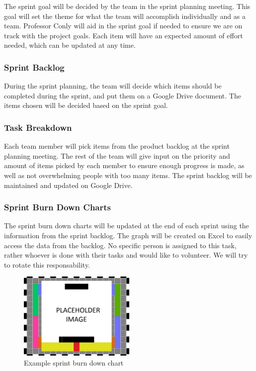 The sprint goal will be decided by the team in the sprint planning meeting. This goal will set the theme for what the team will accomplish individually and as a team. Professor Conly will aid in the sprint goal if needed to ensure we are on track with the project goals. Each item will have an expected amount of effort needed, which can be updated at any time.

\subsubsection{Sprint Backlog}

During the sprint planning, the team will decide which items should be completed during the sprint, and put them on a Google Drive document. The items chosen will be decided based on the sprint goal.

\subsubsection{Task Breakdown}

Each team member will pick items from the product backlog at the sprint planning meeting. The rest of the team will give input on the priority and amount of items picked by each member to ensure enough progress is made, as well as not overwhelming people with too many items. The sprint backlog will be maintained and updated on Google Drive.

\subsubsection{Sprint Burn Down Charts}

The sprint burn down charts will be updated at the end of each sprint using the information from the sprint backlog. The graph will be created on Excel to easily access the data from the backlog. No specific person is assigned to this task, rather whoever is done with their tasks and would like to volunteer. We will try to rotate this responsability.

\begin{figure}[h!]
    \centering
    \includegraphics[width=0.5\textwidth]{images/test_image}
    \caption{Example sprint burn down chart}
\end{figure}

